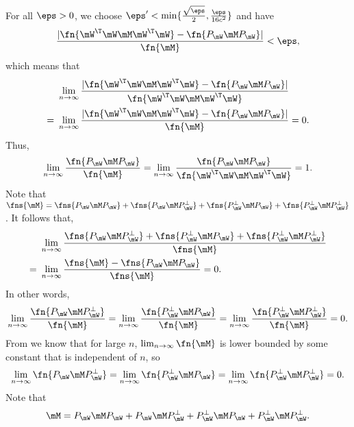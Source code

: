 For all $\eps>0$, we choose $\eps'<\min\{\frac{\sqrt{\eps}}{2},\frac{\eps}{16c^2}\}$ and have
\begin{equation}
    \frac{|\fn{\mW^\T\mW\mM \mW^\T\mW} - \fn{P_\mW\mM P_\mW}|}{\fn{\mM }} < \eps,
\end{equation}
which means that
\begin{equation}
\begin{split}
    &\lim_{n\to\infty}\frac{|\fn{\mW^\T\mW\mM \mW^\T\mW} - \fn{P_\mW\mM P_\mW}|}{\fn{\mW^\T\mW\mM \mW^\T\mW}}\\
    =\ &\lim_{n\to\infty}\frac{|\fn{\mW^\T\mW\mM \mW^\T\mW} - \fn{P_\mW\mM P_\mW}|}{\fn{\mM }}=0.
\end{split}
\end{equation}
Thus,
\begin{equation}
    \lim_{n\to\infty}\frac{\fn{P_\mW\mM P_\mW}}{\fn{\mM }}=\lim_{n\to\infty}\frac{\fn{P_\mW\mM P_\mW}}{\fn{\mW^\T\mW\mM \mW^\T\mW}}=1.
\end{equation}
Note that $\fns{\mM }=\fns{P_\mW\mM P_\mW}+\fns{P_\mW\mM P_\mW^\perp}+\fns{P_\mW^\perp \mM P_\mW}+\fns{P_\mW^\perp \mM P_\mW^\perp}$. It follows that, 
\begin{equation}
\begin{split}
    &\lim_{n\to\infty}\frac{\fns{P_\mW\mM P_\mW^\perp}+\fns{P_\mW^\perp \mM P_\mW}+\fns{P_\mW^\perp \mM P_\mW^\perp}}{\fns{\mM }}\\
    =\ &\lim_{n\to\infty}\frac{\fns{\mM }-\fns{P_\mW\mM P_\mW}}{\fns{\mM }}=0.
\end{split}
\end{equation}
In other words,
\begin{equation}
    \lim_{n\to\infty}\frac{\fn{P_\mW\mM P_\mW^\perp}}{\fn{\mM }}=\lim_{n\to\infty}\frac{\fn{P_\mW^\perp \mM P_\mW}}{\fn{\mM }}=\lim_{n\to\infty}\frac{\fn{P_\mW^\perp \mM P_\mW^\perp}}{\fn{\mM }}=0.
\end{equation}
From  we know that for large $n$, $\lim_{n\to\infty}\fn{\mM }$ is lower bounded by some constant that is independent of $n$, so
\begin{equation}
    \lim_{n\to\infty}\fn{P_\mW\mM P_\mW^\perp} = \lim_{n\to\infty}\fn{P_\mW^\perp \mM P_\mW} = \lim_{n\to\infty}\fn{P_\mW^\perp \mM P_\mW^\perp} = 0.
\end{equation}
Note that
\begin{equation}
    \mM  = P_\mW\mM P_\mW + P_\mW\mM P_\mW^\perp + P_\mW^\perp \mM P_\mW + P_\mW^\perp \mM P_\mW^\perp.
\end{equation}

